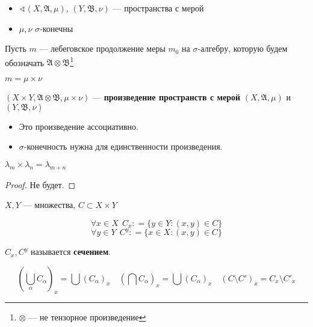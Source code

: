 \begin{definition}\itemfix
    \begin{itemize}
        \item \(\sphericalangle (X, \mathfrak{A}, \mu)\), \((Y, \mathfrak{B}, \nu)\) --- пространства с мерой
        \item \(\mu, \nu\) \(\sigma\)-конечны
    \end{itemize}

    Пусть \(m\) --- лебеговское продолжение меры \(m_0\) на \(\sigma\)-алгебру, которую будем обозначать \(\mathfrak{A} \otimes \mathfrak{B}\)\footnote{\(\otimes\) --- не тензорное произведение}

    \begin{obozn}
        \(m = \mu \times \nu\)
    \end{obozn}

    \((X \times Y, \mathfrak{A} \otimes \mathfrak{B}, \mu \times \nu)\) --- \textbf{произведение пространств с мерой} \((X, \mathfrak{A}, \mu)\) и \((Y, \mathfrak{B}, \nu)\)
\end{definition}

\begin{remark}\itemfix
    \begin{itemize}
        \item Это произведение ассоциативно.
        \item \(\sigma\)-конечность нужна для единственности произведения.
    \end{itemize}
\end{remark}

\begin{theorem}
    \(\lambda_m \times \lambda_n = \lambda_{m + n}\)
\end{theorem}
\begin{proof}
    Не будет.
\end{proof}

\begin{definition}
    \(X, Y\) --- множества, \(C \subset X \times Y\)

    \[\forall x\in X \ \ C_x : = \{y\in Y : (x, y)\in C\}\]
    \[\forall y\in Y \ \ C^y : = \{x\in X : (x, y)\in C\}\]

    \(C_x, C^y\) называется \textbf{сечением}.
\end{definition}

\begin{remark}
    \[\left( \bigcup_\alpha C_\alpha \right)_x = \bigcup (C_\alpha)_x \quad \left( \bigcap C_\alpha \right)_x = \bigcup (C_\alpha)_x \quad (C \setminus C')_x = C_x \setminus C'_x \]
\end{remark}

